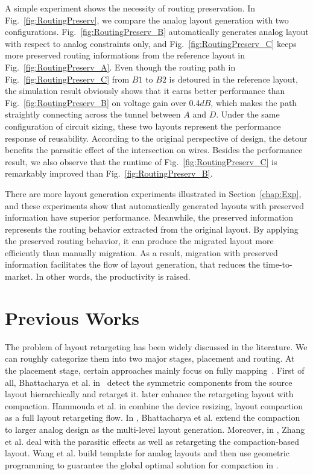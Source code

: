   A simple experiment shows the necessity of routing preservation. In Fig.~\ref{fig:RoutingPreserv}, we compare the analog layout generation with two configurations. Fig.~\ref{fig:RoutingPreserv_B} automatically generates analog layout with respect to analog constraints only, and Fig.~\ref{fig:RoutingPreserv_C} keeps more preserved routing informations from the reference layout in Fig.~\ref{fig:RoutingPreserv_A}. Even though the routing path in Fig.~\ref{fig:RoutingPreserv_C} from $B1$ to $B2$ is detoured in the reference layout, the simulation result obviously shows that it earns better performance than Fig.~\ref{fig:RoutingPreserv_B} on voltage gain over 0.4$dB$, which makes the path straightly connecting across the tunnel between $A$ and $D$. Under the same configuration of circuit sizing, these two layouts represent the performance response of reusability. According to the original perspective of design, the detour benefits the parasitic effect of the intersection on wires. Besides the performance result, we also observe that the runtime of Fig.~\ref{fig:RoutingPreserv_C} is remarkably improved than Fig.~\ref{fig:RoutingPreserv_B}. 
  
  There are more layout generation experiments illustrated in Section~\ref{chap:Exp}, and these experiments show that automatically generated layouts with preserved information have superior performance. Meanwhile, the preserved information represents the routing behavior extracted from the original layout. By applying the preserved routing behavior, it can produce the migrated layout more efficiently than manually migration. As a result, migration with preserved information facilitates the flow of layout generation, that reduces the time-to-market. In other words, the productivity is raised.

  \section{Previous Works}\label{sec:PreWork}

  The problem of layout retargeting has been widely discussed in the literature. We can roughly categorize them into two major stages, placement and routing. At the placement stage, certain approaches mainly focus on fully mapping~\cite{Bhattacharya_ASPDAC04,cbc-bhattacharya-dac04,msc-bhattacharya-tcad06,Zhang_TCAD08,LayoutRetarg_Liu_ASPDAC2010,Wang_ALRGP_TODAES2011}. First of all, Bhattacharya et al. in~\cite{Bhattacharya_ASPDAC04} detect the symmetric components from the source layout hierarchically and retarget it. \cite{cbc-bhattacharya-dac04} later enhance the retargeting layout with compaction. Hammouda et al. in\cite{cart-hammouda-dac06} combine the device resizing, layout compaction as a full layout retargeting flow. In \cite{msc-bhattacharya-tcad06}, Bhattacharya et al. extend the compaction to larger analog design as the multi-level layout generation. Moreover, in \cite{Zhang_TCAD08}, Zhang et al. deal with the parasitic effects as well as retargeting the compaction-based layout. Wang et al. build template for analog layouts and then use geometric programming to guarantee the global optimal solution for compaction in \cite{Wang_ALRGP_TODAES2011}. 

